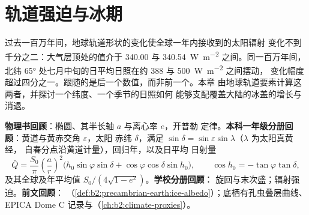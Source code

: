 \chapter{轨道强迫与冰期}\label{ch:b2:orbital-forcing}

过去一百万年间，地球轨道形状的变化使全球一年内接收到的太阳辐射
变化不到千分之二：大气层顶处的值介于 \num{340.00} 与
\qty{340.54}{W.m^{-2}} 之间。同一百万年间，
北纬 \ang{65} 处七月中旬的日平均日照在约 388 与 \qty{500}{W.m^{-2}} 之间摆动，
变化幅度超过四分之一。跟随的是后一个数值，而非前一个。本章
由地球轨道要素计算这两者，并探讨一个纬度、一个季节的日照如何
能够支配覆盖大陆的冰盖的增长与消退。

\begin{recall}
\textbf{物理书回顾}：椭圆、其半长轴 $a$ 与离心率 $e$，开普勒
定律。\textbf{本科一年级分册回顾}：黄道与黄赤交角 $\varepsilon$，太阳
赤纬 $\delta$，满足 $\sin\delta = \sin\varepsilon\sin\lambda$（$\lambda$ 为太阳真黄经，
自春分点沿黄道计量），回归年，以及日平均
日射量
\[
  \bar Q = \frac{S_0}{\pi}\left(\frac{a}{r}\right)^{2}\bigl(h_0\sin\varphi\sin\delta +
  \cos\varphi\cos\delta\sin h_0\bigr),\qquad \cos h_0 = -\tan\varphi\tan\delta ,
\]
及其全球及年平均值 $S_0/(4\sqrt{1 - e^2})$。\textbf{学校分册回顾}：
旋回与末次盛；辐射强迫。\textbf{前文回顾}：
（\cref{def:b2:precambrian-earth:ice-albedo}）；底栖有孔虫叠层曲线、EPICA
Dome C 记录与（\cref{ch:b2:climate-proxies}）。
\end{recall}

